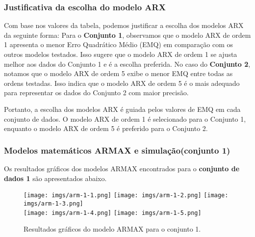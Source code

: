 \documentclass[a4paper,12pt]{article}
\begin{document}
\subsubsection{Justificativa da escolha do modelo ARX}

Com base nos valores da tabela, podemos justificar a escolha dos modelos ARX da seguinte forma: Para o \textbf{Conjunto 1}, observamos que o modelo ARX de ordem 1 apresenta o menor Erro Quadrático Médio (EMQ) em comparação com os outros modelos testados. Isso sugere que o modelo ARX de ordem 1 se ajusta melhor aos dados do Conjunto 1 e é a escolha preferida.
No caso do \textbf{Conjunto 2}, notamos que o modelo ARX de ordem 5 exibe o menor EMQ entre todas as ordens testadas. Isso indica que o modelo ARX de ordem 5 é o mais adequado para representar os dados do Conjunto 2 com maior precisão.

Portanto, a escolha dos modelos ARX é guiada pelos valores de EMQ em cada conjunto de dados. O modelo ARX de ordem 1 é selecionado para o Conjunto 1, enquanto o modelo ARX de ordem 5 é preferido para o Conjunto 2.

\subsubsection{Modelos matemáticos ARMAX e simulação(conjunto 1)}

Os resultados gráficos dos modelos ARMAX encontrados para o \textbf{conjunto de dados 1} são apresentados abaixo.

\begin{figure}[h!]
\centering

\texttt{[image: imgs/arm-1-1.png]} \quad
\texttt{[image: imgs/arm-1-2.png]} \quad
\texttt{[image: imgs/arm-1-3.png]} \\

\texttt{[image: imgs/arm-1-4.png]} \quad
\texttt{[image: imgs/arm-1-5.png]}

\caption{Resultados gráficos do modelo ARMAX para o conjunto 1.}
\end{figure}
\end{document}
